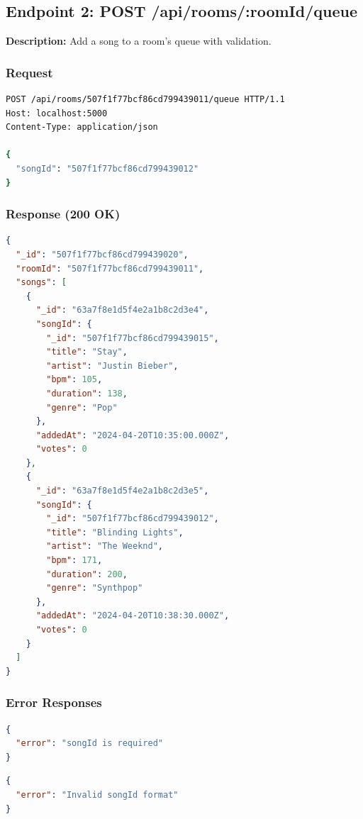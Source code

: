 \documentclass[11pt,a4paper]{article}
\begin{document}
\subsection{Endpoint 2: POST /api/rooms/:roomId/queue}

\textbf{Description:} Add a song to a room's queue with validation.

\subsubsection{Request}

\begin{lstlisting}[language=bash]
POST /api/rooms/507f1f77bcf86cd799439011/queue HTTP/1.1
Host: localhost:5000
Content-Type: application/json

{
  "songId": "507f1f77bcf86cd799439012"
}
\end{lstlisting}

\subsubsection{Response (200 OK)}

\begin{lstlisting}[language=json]
{
  "_id": "507f1f77bcf86cd799439020",
  "roomId": "507f1f77bcf86cd799439011",
  "songs": [
    {
      "_id": "63a7f8e1d5f4e2a1b8c2d3e4",
      "songId": {
        "_id": "507f1f77bcf86cd799439015",
        "title": "Stay",
        "artist": "Justin Bieber",
        "bpm": 105,
        "duration": 138,
        "genre": "Pop"
      },
      "addedAt": "2024-04-20T10:35:00.000Z",
      "votes": 0
    },
    {
      "_id": "63a7f8e1d5f4e2a1b8c2d3e5",
      "songId": {
        "_id": "507f1f77bcf86cd799439012",
        "title": "Blinding Lights",
        "artist": "The Weeknd",
        "bpm": 171,
        "duration": 200,
        "genre": "Synthpop"
      },
      "addedAt": "2024-04-20T10:38:30.000Z",
      "votes": 0
    }
  ]
}
\end{lstlisting}

\subsubsection{Error Responses}

\begin{lstlisting}[language=json, caption=400 Bad Request - Missing songId]
{
  "error": "songId is required"
}
\end{lstlisting}

\begin{lstlisting}[language=json, caption=400 Bad Request - Invalid ObjectId]
{
  "error": "Invalid songId format"
}
\end{lstlisting}
\end{document}
